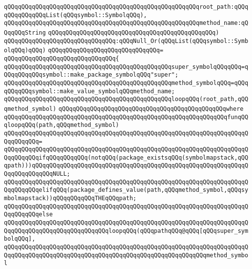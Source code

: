 \verb|qQQqqQQqqQQqqQQqqQQqqQQqqQQqqQQqqQQqqQQqqQQqqQQqqQQqqQQqroot_path:qQQqqQQqqQQqqQQqList(qQQqsymbol::SymbolqQQq),|\newline
\verb|qQQqqQQqqQQqqQQqqQQqqQQqqQQqqQQqqQQqqQQqqQQqqQQqqQQqqQQqmethod_name:qQQqqQQqString|\newline
\verb|qQQqqQQqqQQqqQQqqQQqqQQqqQQqqQQqqQQqqQQqqQQqqQQq)|\newline
\verb|qQQqqQQqqQQqqQQqqQQqqQQqqQQqqQQq:qQQqNull_Or(qQQqList(qQQqsymbol::SymbolqQQq)qQQq)|\newline
\verb|qQQqqQQqqQQqqQQqqQQqqQQqqQQqqQQq=|\newline
\verb|qQQqqQQqqQQqqQQqqQQqqQQqqQQqqQQq{|\newline
\verb|qQQqqQQqqQQqqQQqqQQqqQQqqQQqqQQqqQQqqQQqqQQqqQQqsuper_symbolqQQqqQQq=qQQqqQQqqQQqsymbol::make_package_symbolqQQq"super";|\newline
\verb|qQQqqQQqqQQqqQQqqQQqqQQqqQQqqQQqqQQqqQQqqQQqqQQqmethod_symbolqQQq=qQQqqQQqqQQqsymbol::make_value_symbolqQQqmethod_name;|\newline
\newline
\verb|qQQqqQQqqQQqqQQqqQQqqQQqqQQqqQQqqQQqqQQqqQQqqQQqloopqQQq(root_path,qQQqmethod_symbol)|\newline
\verb|qQQqqQQqqQQqqQQqqQQqqQQqqQQqqQQqqQQqqQQqqQQqqQQqwhere|\newline
\verb|qQQqqQQqqQQqqQQqqQQqqQQqqQQqqQQqqQQqqQQqqQQqqQQqqQQqqQQqqQQqqQQqfunqQQqloopqQQq(path,qQQqmethod_symbol)|\newline
\verb|qQQqqQQqqQQqqQQqqQQqqQQqqQQqqQQqqQQqqQQqqQQqqQQqqQQqqQQqqQQqqQQqqQQqqQQqqQQqqQQq=|\newline
\verb|qQQqqQQqqQQqqQQqqQQqqQQqqQQqqQQqqQQqqQQqqQQqqQQqqQQqqQQqqQQqqQQqqQQqqQQqqQQqqQQqifqQQqqQQqqQQq(notqQQq(package_existsqQQq(symbolmapstack,qQQqpath)))qQQqqQQqqQQqqQQqqQQqqQQqqQQqqQQqqQQqqQQqqQQqqQQqqQQqqQQqqQQqqQQqqQQqqQQqqQQqNULL;|\newline
\verb|qQQqqQQqqQQqqQQqqQQqqQQqqQQqqQQqqQQqqQQqqQQqqQQqqQQqqQQqqQQqqQQqqQQqqQQqqQQqqQQqelifqQQq(package_defines_value(path,qQQqmethod_symbol,qQQqsymbolmapstack))qQQqqQQqqQQqTHEqQQqpath;|\newline
\verb|qQQqqQQqqQQqqQQqqQQqqQQqqQQqqQQqqQQqqQQqqQQqqQQqqQQqqQQqqQQqqQQqqQQqqQQqqQQqqQQqelse|\newline
\verb|qQQqqQQqqQQqqQQqqQQqqQQqqQQqqQQqqQQqqQQqqQQqqQQqqQQqqQQqqQQqqQQqqQQqqQQqqQQqqQQqqQQqqQQqqQQqqQQqqQQqloopqQQq(qQQqpathqQQq@qQQq[qQQqsuper_symbolqQQq],|\newline
\verb|qQQqqQQqqQQqqQQqqQQqqQQqqQQqqQQqqQQqqQQqqQQqqQQqqQQqqQQqqQQqqQQqqQQqqQQqqQQqqQQqqQQqqQQqqQQqqQQqqQQqqQQqqQQqqQQqqQQqqQQqqQQqqQQqmethod_symbol|\newline
